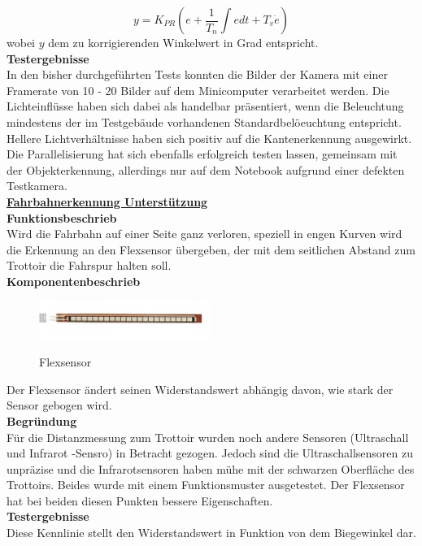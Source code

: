 \[
y = K_{PR}\left(e + \frac{1}{T_n}\int{edt} + T_v\dot{e}\right)
\]
wobei $y$ dem zu korrigierenden Winkelwert in Grad entspricht.
\\[0.2cm]
\textbf{Testergebnisse}\\[0.2cm]
In den bisher durchgeführten Tests konnten die Bilder der Kamera mit einer Framerate von 10 - 20 Bilder auf dem Minicomputer verarbeitet werden. Die Lichteinflüsse haben sich dabei als handelbar präsentiert, wenn die Beleuchtung mindestens der im Testgebäude vorhandenen Standardbelöeuchtung entspricht. Hellere Lichtverhältnisse haben sich positiv auf die Kantenerkennung ausgewirkt.\\
Die Parallelisierung hat sich ebenfalls erfolgreich testen lassen, gemeinsam mit der Objekterkennung, allerdings nur auf dem Notebook aufgrund einer defekten Testkamera.
\\[0.2cm]
\underline{\textbf{Fahrbahnerkennung Unterstützung}}
\\[0.2cm]
\textbf{Funktionsbeschrieb}\\[0.2cm]
Wird die Fahrbahn auf einer Seite ganz verloren, speziell in engen Kurven wird die Erkennung an den Flexsensor übergeben, der mit dem seitlichen Abstand zum Trottoir die Fahrspur halten soll.\\[0.2cm]
\textbf{Komponentenbeschrieb}\\[0.2cm]
\begin{figure}[H]
	\centering
	\includegraphics[width=0.5\textwidth]{03_Loesungskonzept/pictures/Flexsensor.jpg}
	\label{fig:Flexsensor}
	\caption{Flexsensor}
\end{figure}\flushleft%
Der Flexsensor ändert seinen Widerstandswert abhängig davon, wie stark der Sensor gebogen wird. \\[0.2cm]
%
\textbf{Begründung}\\[0.2cm]
Für die Distanzmessung zum Trottoir wurden noch andere Sensoren (Ultraschall und Infrarot -Sensro) in Betracht gezogen. Jedoch sind die Ultraschallsensoren zu unpräzise und die Infrarotsensoren haben mühe mit der schwarzen Oberfläche des Trottoirs. Beides wurde mit einem Funktionsmuster ausgetestet. Der Flexsensor hat bei beiden diesen Punkten bessere Eigenschaften.\\[0.2cm]
\textbf{Testergebnisse}\\[0.2cm]
Diese Kennlinie stellt den Widerstandswert in Funktion von dem Biegewinkel dar.
